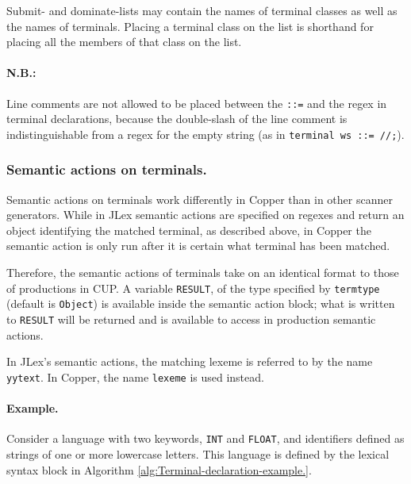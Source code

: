 \documentclass[12pt,english,twoside]{report}
\begin{document}
Submit- and dominate-lists may contain the names of terminal classes
as well as the names of terminals. Placing a terminal class on the
list is shorthand for placing all the members of that class on the
list.


\paragraph{N.B.:}

Line comments are not allowed to be placed between the \texttt{::=}
and the regex in terminal declarations, because the double-slash of
the line comment is indistinguishable from a regex for the empty string
(as in \texttt{terminal ws ::= //;}).


\subsubsection{Semantic actions on terminals.}

Semantic actions on terminals work differently in Copper than in other
scanner generators. While in JLex semantic actions are specified on
regexes and return an object identifying the matched terminal, as
described above, in Copper the semantic action is only run after it
is certain what terminal has been matched.

Therefore, the semantic actions of terminals take on an identical
format to those of productions in CUP. A variable \texttt{RESULT},
of the type specified by \texttt{termtype} (default is \texttt{Object})
is available inside the semantic action block; what is written to
\texttt{RESULT} will be returned and is available to access in production
semantic actions.

In JLex's semantic actions, the matching lexeme is referred to by
the name \texttt{yytext}. In Copper, the name \texttt{lexeme} is used
instead.


\paragraph{Example.}

Consider a language with two keywords, \texttt{INT} and \texttt{FLOAT},
and identifiers defined as strings of one or more lowercase letters.
This language is defined by the lexical syntax block in Algorithm
\ref{alg:Terminal-declaration-example.}.
\end{document}
